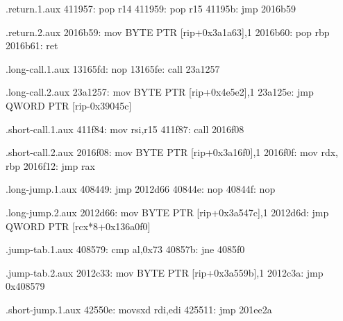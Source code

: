 
\begin{filecontents*}{\jobname.return.1.aux}
411957: pop  r14
411959: pop  r15
41195b: jmp  2016b59
\end{filecontents*}

\begin{filecontents*}{\jobname.return.2.aux}
2016b59: mov BYTE PTR [rip+0x3a1a63],1
2016b60: pop rbp
2016b61: ret 
\end{filecontents*}

\begin{filecontents*}{\jobname.long-call.1.aux}
13165fd: nop
13165fe: call 23a1257
\end{filecontents*}

\begin{filecontents*}{\jobname.long-call.2.aux}
23a1257: mov BYTE PTR [rip+0x4e5e2],1
23a125e: jmp QWORD PTR [rip-0x39045c]
\end{filecontents*}

\begin{filecontents*}{\jobname.short-call.1.aux}
411f84: mov  rsi,r15
411f87: call 2016f08 
\end{filecontents*}

\begin{filecontents*}{\jobname.short-call.2.aux}
2016f08: mov BYTE PTR [rip+0x3a16f0],1
2016f0f: mov rdx, rbp
2016f12: jmp rax
\end{filecontents*}

\begin{filecontents*}{\jobname.long-jump.1.aux}
408449: jmp  2012d66
40844e: nop
40844f: nop
\end{filecontents*}

\begin{filecontents*}{\jobname.long-jump.2.aux}
2012d66: mov BYTE PTR [rip+0x3a547c],1
2012d6d: jmp QWORD PTR [rcx*8+0x136a0f0]
\end{filecontents*}

\begin{filecontents*}{\jobname.jump-tab.1.aux}
408579: cmp al,0x73
40857b: jne 4085f0 
\end{filecontents*}

\begin{filecontents*}{\jobname.jump-tab.2.aux}
2012c33: mov BYTE PTR [rip+0x3a559b],1
2012c3a: jmp 0x408579    
\end{filecontents*}

\begin{filecontents*}{\jobname.short-jump.1.aux}
42550e: movsxd rdi,edi
425511: jmp    201ee2a 
\end{filecontents*}

